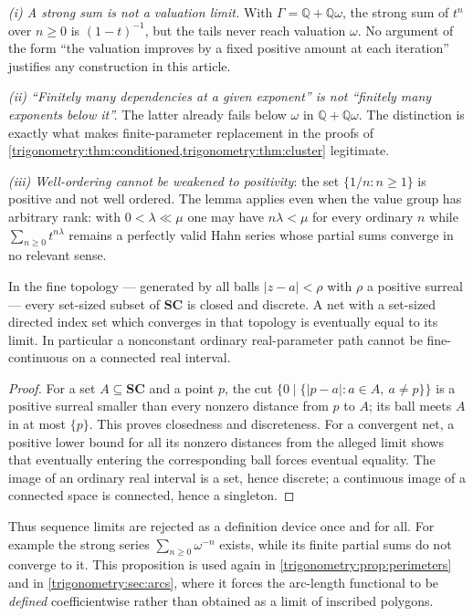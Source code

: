 \documentclass[11pt,letterpaper]{article}
\numberwithin{equation}{section}
\theoremstyle{definition}
\theoremstyle{remark}
\newcommand{\SC}{\mathbf{SC}}
\newcommand{\Q}{\mathbb Q}
\begin{document}
\begin{remark}\label{trigonometry:rem:notlimit}
\emph{(i) A strong sum is not a valuation limit.} With $\Gamma=\Q+\Q\omega$, the strong sum of
$t^n$ over $n\ge0$ is $(1-t)^{-1}$, but the tails never reach valuation $\omega$. No argument of
the form ``the valuation improves by a fixed positive amount at each iteration'' justifies any
construction in this article.

\emph{(ii) ``Finitely many dependencies at a given exponent'' is not ``finitely many exponents
below it''.} The latter already fails below $\omega$ in $\Q+\Q\omega$. The distinction is exactly
what makes finite-parameter replacement in the proofs of
\cref{trigonometry:thm:conditioned,trigonometry:thm:cluster} legitimate.

\emph{(iii) Well-ordering cannot be weakened to positivity}: the set $\{1/n:n\ge1\}$ is positive
and not well ordered. The lemma applies even when the value group has arbitrary rank: with
$0<\lambda\ll\mu$ one may have $n\lambda<\mu$ for every ordinary $n$ while
$\sum_{n\ge0}t^{n\lambda}$ remains a perfectly valid Hahn series whose partial sums converge in no
relevant sense.
\end{remark}

\begin{proposition}\label{trigonometry:prop:topology}
In the fine topology --- generated by all balls $|z-a|<\rho$ with $\rho$ a positive surreal ---
every set-sized subset of $\SC$ is closed and discrete. A net with a set-sized directed index set
which converges in that topology is eventually equal to its limit. In particular a nonconstant
ordinary real-parameter path cannot be fine-continuous on a connected real interval.
\end{proposition}
\begin{proof}
For a set $A\subseteq\SC$ and a point $p$, the cut $\{0\mid\{|p-a|:a\in A,\ a\ne p\}\}$ is a
positive surreal smaller than every nonzero distance from $p$ to $A$; its ball meets $A$ in at most
$\{p\}$. This proves closedness and discreteness. For a convergent net, a positive lower bound for
all its nonzero distances from the alleged limit shows that eventually entering the corresponding
ball forces eventual equality. The image of an ordinary real interval is a set, hence discrete; a
continuous image of a connected space is connected, hence a singleton.
\end{proof}
Thus sequence limits are rejected as a definition device once and for all. For example the strong
series $\sum_{n\ge0}\omega^{-n}$ exists, while its finite partial sums do not converge to it. This
proposition is used again in \cref{trigonometry:prop:perimeters} and in
\cref{trigonometry:sec:arcs}, where it forces the arc-length functional to be \emph{defined}
coefficientwise rather than obtained as a limit of inscribed polygons.
\end{document}
